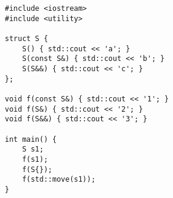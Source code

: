 \begin{lstlisting}[title=\href{https://godbolt.org/z/4MKojT}{\texttt{godbolt.org/z/4MKojT}}]
#include <iostream>
#include <utility>

struct S {
    S() { std::cout << 'a'; }
    S(const S&) { std::cout << 'b'; }
    S(S&&) { std::cout << 'c'; }
};

void f(const S&) { std::cout << '1'; }
void f(S&) { std::cout << '2'; }
void f(S&&) { std::cout << '3'; }

int main() {
    S s1;
    f(s1);
    f(S{});
    f(std::move(s1));
}
\end{lstlisting}
